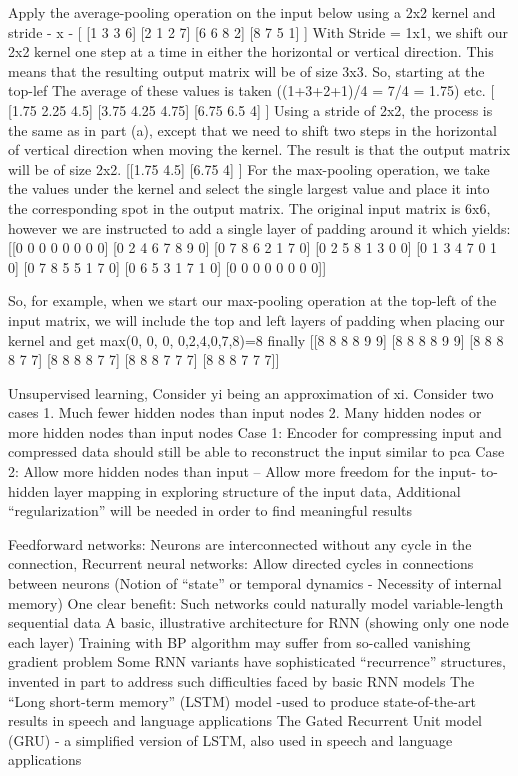 \documentclass[10pt]{article}
\begin{document}
\smallbreak
{} Apply the average-pooling operation on the input below using a 2x2 kernel and stride - x -
[
[1 3 3 6]
[2 1 2 7]
[6 6 8 2]
[8 7 5 1]
]
\NEW  With Stride = 1x1, we shift our 2x2 kernel one step at a time in either the horizontal or
vertical direction. This means that the resulting output matrix will be of size 3x3. So, starting at the top-lef The average of these values is taken ((1+3+2+1)/4 = 7/4 = 1.75) etc.
[
[1.75 2.25 4.5]
[3.75 4.25 4.75]
[6.75 6.5 4]
]
\NEW Using a stride of 2x2, the process is the same as in part (a), except that we need to shift
two steps in the horizontal of vertical direction when moving the kernel. The result is
that the output matrix will be of size 2x2.
[[1.75 4.5]
[6.75 4]
]
\smallbreak
\NEW For the max-pooling operation, we take the values under the kernel and select the single largest value and place it into the corresponding spot in the output matrix.  The original input matrix is 6x6, however we are instructed to add a single layer of padding around it which yields:
[[0 0 0 0 0 0 0 0]
[0 2 4 6 7 8 9 0]
[0 7 8 6 2 1 7 0]
[0 2 5 8 1 3 0 0]
[0 1 3 4 7 0 1 0]
[0 7 8 5 5 1 7 0]
[0 6 5 3 1 7 1 0]
[0 0 0 0 0 0 0 0]]

\NEW So, for example, when we start our max-pooling operation at the top-left of the input matrix, we will include the top and left layers of padding when placing our kernel and get max(0, 0, 0, 0,2,4,0,7,8)=8 finally
[[8 8 8 8 9 9]
[8 8 8 8 9 9]
[8 8 8 8 7 7]
[8 8 8 8 7 7]
[8 8 8 7 7 7]
[8 8 8 7 7 7]]

\smallskip

 Unsupervised learning, Consider yi being an approximation of xi.
\NEW Consider two cases 1. Much fewer hidden nodes than input nodes 2. Many hidden nodes or more hidden nodes than input nodes
\NEW Case 1: Encoder for compressing input and compressed data should still be able to reconstruct the input similar to pca
\NEW Case 2: Allow more hidden nodes than input -- Allow more freedom for the input- to-hidden layer mapping in exploring structure of the input data, Additional “regularization” will be needed in order to find meaningful results

\smallskip
{} Feedforward networks: Neurons are interconnected without any cycle in the connection, Recurrent neural networks: Allow directed cycles in connections between neurons (Notion of “state” or temporal dynamics - Necessity of internal memory)
\NEW One clear benefit: Such networks could naturally model variable-length sequential data
\NEW A basic, illustrative architecture for RNN (showing only one node each layer)
\NEW Training with BP algorithm may suffer from so-called vanishing gradient problem
\NEW Some RNN variants have sophisticated “recurrence” structures, invented in part to address such difficulties faced by basic RNN models
\NEW The “Long short-term memory” (LSTM) model -used to produce state-of-the-art results in speech and language applications
\NEW The Gated Recurrent Unit model (GRU) - a simplified version of LSTM, also used in speech and language applications
\end{document}
